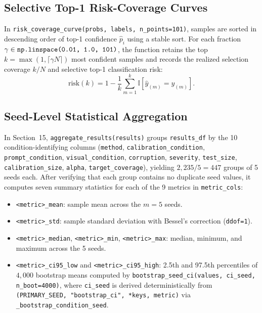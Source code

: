 \documentclass[11pt,a4paper]{article}
\begin{document}
\subsection{Selective Top-1 Risk-Coverage Curves}
In \texttt{risk\_\allowbreak{}coverage\_\allowbreak{}curve(probs, labels, n\_\allowbreak{}points=101)}, samples are sorted in descending order of top-1 confidence $\hat{p}_i$ using a stable sort. For each fraction $\gamma \in \text{\texttt{np.linspace(0.01, 1.0, 101)}}$, the function retains the top $k = \max(1, \lceil \gamma N \rceil)$ most confident samples and records the realized selection coverage $k / N$ and selective top-1 classification risk:
\begin{equation}
  \label{eq:risk_cov}
  \text{risk}(k) = 1 - \frac{1}{k} \sum_{m=1}^{k} \mathbb{I}[\hat{y}_{(m)} = y_{(m)}].
\end{equation}

\subsection{Seed-Level Statistical Aggregation}
In Section~15, \texttt{aggregate\_\allowbreak{}results(results)} groups \texttt{results\_\allowbreak{}df} by the 10 condition-identifying columns (\texttt{method}, \texttt{calibration\_\allowbreak{}condition}, \texttt{prompt\_\allowbreak{}condition}, \texttt{visual\_\allowbreak{}condition}, \texttt{corruption}, \texttt{severity}, \texttt{test\_\allowbreak{}size}, \texttt{calibration\_\allowbreak{}size}, \texttt{alpha}, \texttt{target\_\allowbreak{}coverage}), yielding $2{,}235 / 5 = 447$ groups of 5 seeds each. After verifying that each group contains no duplicate seed values, it computes seven summary statistics for each of the 9 metrics in \texttt{metric\_\allowbreak{}cols}:
\begin{itemize}
  \item \texttt{<metric>\_\allowbreak{}mean}: sample mean across the $m = 5$ seeds.
  \item \texttt{<metric>\_\allowbreak{}std}: sample standard deviation with Bessel's correction (\texttt{ddof=1}).
  \item \texttt{<metric>\_\allowbreak{}median}, \texttt{<metric>\_\allowbreak{}min}, \texttt{<metric>\_\allowbreak{}max}: median, minimum, and maximum across the 5 seeds.
  \item \texttt{<metric>\_\allowbreak{}ci95\_\allowbreak{}low} and \texttt{<metric>\_\allowbreak{}ci95\_\allowbreak{}high}: 2.5th and 97.5th percentiles of $4{,}000$ bootstrap means computed by \texttt{bootstrap\_\allowbreak{}seed\_\allowbreak{}ci(values, ci\_\allowbreak{}seed, n\_\allowbreak{}boot=4000)}, where \texttt{ci\_\allowbreak{}seed} is derived deterministically from \texttt{(PRIMARY\_\allowbreak{}SEED, "bootstrap\_\allowbreak{}ci", *keys, metric)} via \texttt{\_\allowbreak{}bootstrap\_\allowbreak{}condition\_\allowbreak{}seed}.
\end{itemize}
\end{document}
